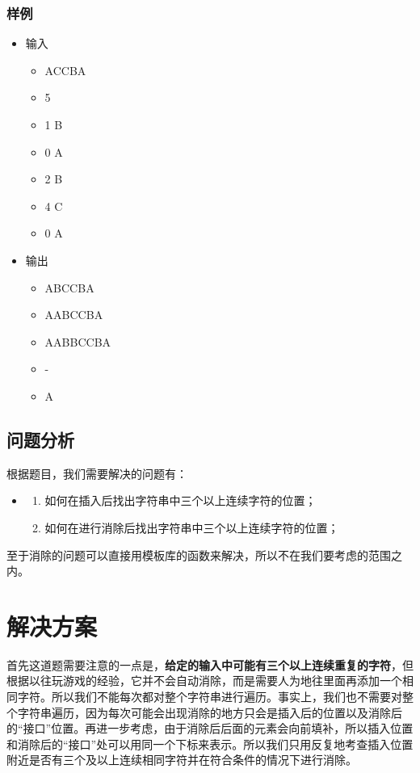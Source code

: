 \documentclass[UTF8]{ctexart}
\begin{document}
	\subsubsection{样例}
	\begin{itemize}
	\item 输入
		\begin{itemize}
			\item[ ]ACCBA
			\item[ ]5
			\item[ ]1 B
			\item[ ]0 A
			\item[ ]2 B
			\item[ ]4 C
			\item[ ]0 A
		\end{itemize}
	\item 输出
		\begin{itemize}
			\item[ ]ABCCBA
			\item[ ]AABCCBA
			\item[ ]AABBCCBA
			\item[ ]-
			\item[ ]A	
		\end{itemize}
	\end{itemize}
	
	\subsection{问题分析}
	\indent 根据题目，我们需要解决的问题有：
	\begin{itemize}
	\item[ ] 
	\begin{enumerate}
	\item 如何在插入后找出字符串中三个以上连续字符的位置；
	\item 如何在进行消除后找出字符串中三个以上连续字符的位置；
	\end{enumerate}
	\end{itemize}	
	
	\indent 至于消除的问题可以直接用模板库的函数来解决，所以不在我们要考虑的范围之内。	
	
	
	\section{解决方案}
	\indent 首先这道题需要注意的一点是，\textbf{给定的输入中可能有三个以上连续重复的字符}，但根据以往玩游戏的经验，它并不会自动消除，而是需要人为地往里面再添加一个相同字符。所以我们不能每次都对整个字符串进行遍历。事实上，我们也不需要对整个字符串遍历，因为每次可能会出现消除的地方只会是插入后的位置以及消除后的“接口”位置。再进一步考虑，由于消除后后面的元素会向前填补，所以插入位置和消除后的“接口”处可以用同一个下标来表示。所以我们只用反复地考查插入位置附近是否有三个及以上连续相同字符并在符合条件的情况下进行消除。
	
\end{document}
